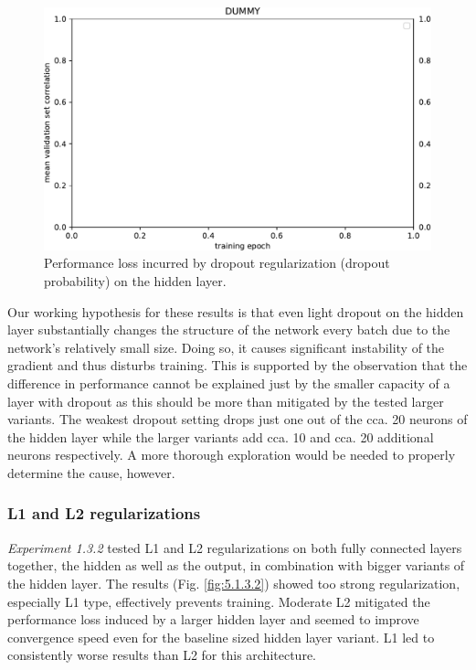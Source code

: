 \begin{figure}[H]
    \centering
    \includegraphics[width=1\textwidth]{../figures/05_dummy}
    \caption[Experiment 1.3.1]{Performance loss incurred by dropout regularization (dropout probability) on the hidden layer.}
    \label{fig:5.1.3.1}
\end{figure}

Our working hypothesis for these results is that even light dropout on the hidden layer substantially changes the structure of the network every batch due to the network’s relatively small size. Doing so, it causes significant instability of the gradient and thus disturbs training. This is supported by the observation that the difference in performance cannot be explained just by the smaller capacity of a layer with dropout as this should be more than mitigated by the tested larger variants. The weakest dropout setting drops just one out of the cca. 20 neurons of the hidden layer while the larger variants add cca. 10 and cca. 20 additional neurons respectively. A more thorough exploration would be needed to properly determine the cause, however.

\subsubsection{L1 and L2 regularizations}

\textit{Experiment 1.3.2} tested L1 and L2 regularizations on both fully connected layers together, the hidden as well as the output, in combination with bigger variants of the hidden layer. The results (Fig. \ref{fig:5.1.3.2}) showed too strong regularization, especially L1 type, effectively prevents training. Moderate L2 mitigated the performance loss induced by a larger hidden layer and seemed to improve convergence speed even for the baseline sized hidden layer variant. L1 led to consistently worse results than L2 for this architecture.

